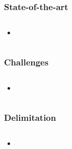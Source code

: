 \begin{frame}
	\frametitle{State-of-the-art}
	
	\begin{columns}[c]
		
		\column{\textwidth}
		\begin{itemize}
			\item 
		\end{itemize}
		
	\end{columns}
	
\end{frame}

\begin{frame}
	\frametitle{Challenges}
	
	\begin{columns}[c]
		
		\column{\textwidth}
		\begin{itemize}
			\item 
		\end{itemize}
		
	\end{columns}
	
\end{frame}

\begin{frame}
	\frametitle{Delimitation}
	
	\begin{columns}[c]
		
		\column{\textwidth}
		\begin{itemize}
			\item 
		\end{itemize}
		
	\end{columns}
	
\end{frame}

